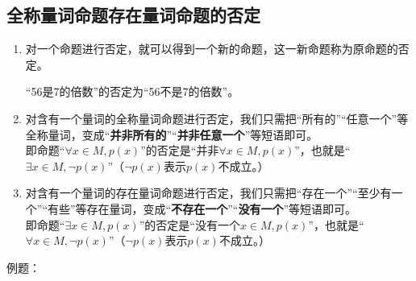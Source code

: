 \subsection*{全称量词命题存在量词命题的否定}
\begin{enumerate}
    \item 对一个命题进行否定，就可以得到一个新的命题，这一新命题称为原命题的否定。
    \begin{example}
        “56是7的倍数”的否定为“56不是7的倍数”。
    \end{example}
    \item 对含有一个量词的全称量词命题进行否定，我们只需把“所有的”“任意一个”等全称量词，变成“\textbf{并非所有的}”“\textbf{并非任意一个}”等短语即可。\\
    即命题“$\forall x \in M, p(x)$”的否定是“并非$\forall x \in M, p(x)$”，也就是“$\exists x \in M, \neg p(x)$”（$\neg p(x)$表示$p(x)$不成立。）
    \item 对含有一个量词的存在量词命题进行否定，我们只需把“存在一个”“至少有一个”“有些”等存在量词，变成“\textbf{不存在一个}”“\textbf{没有一个}”等短语即可。\\
    即命题“$\exists x \in M, p(x)$”的否定是“没有一个$x \in M, p(x)$”，也就是“$\forall x \in M, \neg p(x)$”（$\neg p(x)$表示$p(x)$不成立。）
\end{enumerate}
例题：
